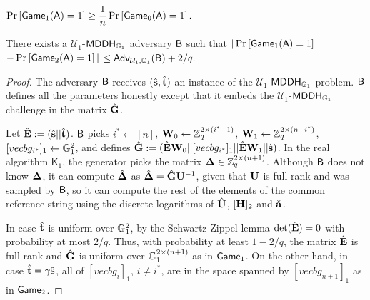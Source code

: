 \begin{lemma} $\Pr\left[ \mathsf{Game}_1(\mathsf{A})=1\right]\geq\dfrac{1}{n}\Pr\left[\mathsf{Game}_0(\mathsf{A})=1\right].$
\label{lemma:bits1}
\end{lemma}

\begin{lemma} There exists a $\mathcal{U}_1$-$\mathsf{MDDH}_{\mathbb{G}_1}$ adversary $\mathsf{B}$ such that
$|\Pr\left[\mathsf{Game}_{1}(\mathsf{A})=1\right]$ $-\Pr\left[\mathsf{Game}_{2}(\mathsf{A})=1\right]|$ $\leq
    \mathsf{Adv}_{\mathcal{U}_1,\mathbb{G}_1}(\mathsf{B}) + 2/q.$
\label{lemma:bits2}
\end{lemma}
\begin{proof}
The adversary $\mathsf{B}$ receives $({\hat{\mathbf{s}}}, {\hat{\mathbf{t}}})$ an instance of the $\mathcal{U}_1$-$\mathsf{MDDH}_{\mathbb{G}_1}$ problem.
$\mathsf{B}$ defines all the parameters honestly except that
it embeds the $\mathcal{U}_1$-$\mathsf{MDDH}_{\mathbb{G}_1}$ challenge in the matrix 
$\hat{\mathbf{{G}}}$.

Let ${\hat{\mathbf{{E}}}}:=({\hat{\mathbf{s}}}||{\hat{\mathbf{t}}})$. $\mathsf{B}$ picks $i^*\gets[n]$, $\mathbf{{W}}_0\gets\mathbb{Z}_q^{2\times(i^*-1)}$,
$\mathbf{{W}}_1\gets\mathbb{Z}_q^{2\times(n-i^*)}$,
$[vecb{g}_{i^*}]_1\gets\mathbb{G}_1^{2}$,
and defines $\hat{\mathbf{{G}}} := ({\hat{\mathbf{{E}}}}\mathbf{{W}}_0||[vecb{g}_{i^*}]_1||{\hat{\mathbf{{E}}}}\mathbf{{W}}_1|| {\hat{\mathbf{s}}})$. 
In the real algorithm $\mathsf{K}_1$, the generator picks the matrix $\mathbf{{\Delta}} \in \mathbb{Z}_q^{2 \times (n+1)}$.
Although $\mathsf{B}$ does not know $\mathbf{{\Delta}}$,  it can compute ${\hat{\mathbf{{\Delta}}}}$ as ${\hat{\mathbf{{\Delta}}}}= \hat{\mathbf{{G}}}\mathbf{{U}}^{-1}$,
given that $\mathbf{{U}}$ is full rank and was  sampled 
by $\mathsf{B}$, so it can compute the rest of the elements of the
common reference string  using the discrete logarithms of ${\hat{\mathbf{{U}}}}$, $[{\mathbf{{H}}}]_2$ and $\check{\mathbf{a}}$.  

In case ${\hat{\mathbf{t}}}$ is uniform over $\mathbb{G}_1^{2}$, by the Schwartz-Zippel lemma $\det({\hat{\mathbf{{E}}}}) = 0$ with probability at most $2/q$.
Thus, with probability at least $1-2/q$, the matrix ${\hat{\mathbf{{E}}}}$ is full-rank and $\hat{\mathbf{{G}}}$ is uniform over $\mathbb{G}_1^{2\times(n+1)}$ as in
$\mathsf{Game}_1$.
On the other hand, in case $\hat{\mathbf{t}}=\gamma {\hat{\mathbf{s}}}$, all of $[vecb{g}_{i}]_1$, $i\neq i^*$, are in the space
spanned by $[vecb{g}_{n+1}]_1$ as in $\mathsf{Game}_2$.
%
\end{proof}

